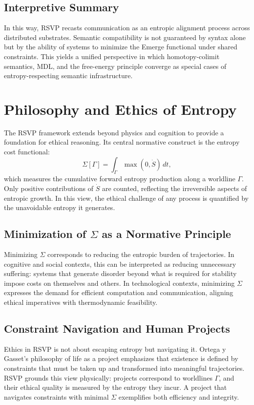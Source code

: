 \documentclass[12pt]{article}
\begin{document}
\subsection{Interpretive Summary}
In this way, RSVP recasts communication as an entropic alignment process across distributed substrates. Semantic compatibility is not guaranteed by syntax alone but by the ability of systems to minimize the Emerge functional under shared constraints. This yields a unified perspective in which homotopy-colimit semantics, MDL, and the free-energy principle converge as special cases of entropy-respecting semantic infrastructure.

\section{Philosophy and Ethics of Entropy}
\label{sec:ethics}

The RSVP framework extends beyond physics and cognition to provide a foundation for ethical reasoning. Its central normative construct is the entropy cost functional:
\begin{equation}
\Sigma[\Gamma] = \int_\Gamma \max(0,\dot S)\,dt ,
\end{equation}
which measures the cumulative forward entropy production along a worldline $\Gamma$. Only positive contributions of $\dot S$ are counted, reflecting the irreversible aspects of entropic growth. In this view, the ethical challenge of any process is quantified by the unavoidable entropy it generates.  

\subsection{Minimization of $\Sigma$ as a Normative Principle}
Minimizing $\Sigma$ corresponds to reducing the entropic burden of trajectories. In cognitive and social contexts, this can be interpreted as reducing unnecessary suffering: systems that generate disorder beyond what is required for stability impose costs on themselves and others. In technological contexts, minimizing $\Sigma$ expresses the demand for efficient computation and communication, aligning ethical imperatives with thermodynamic feasibility.  

\subsection{Constraint Navigation and Human Projects}
Ethics in RSVP is not about escaping entropy but navigating it. Ortega y Gasset’s philosophy of life as a project \cite{Ortega1930} emphasizes that existence is defined by constraints that must be taken up and transformed into meaningful trajectories. RSVP grounds this view physically: projects correspond to worldlines $\Gamma$, and their ethical quality is measured by the entropy they incur. A project that navigates constraints with minimal $\Sigma$ exemplifies both efficiency and integrity.  
\end{document}
